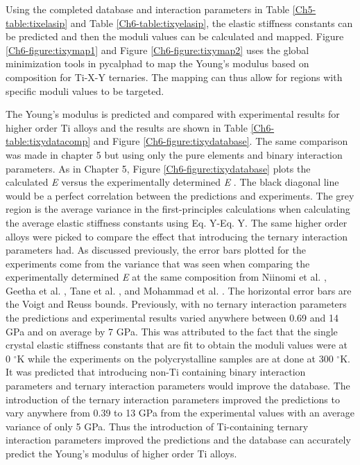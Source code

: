 Using the completed database and interaction parameters in Table \ref{Ch5-table:tixelasip} and Table \ref{Ch6-table:tixyelasip}, the elastic stiffness constants can be predicted and then the moduli values can be calculated and mapped. Figure \ref{Ch6-figure:tixymap1} and Figure \ref{Ch6-figure:tixymap2} uses the global minimization tools in pycalphad \cite{Otis2017} to map the Young's modulus based on composition for Ti-X-Y ternaries. The mapping can thus allow for regions with specific moduli values to be targeted.

The Young's modulus is predicted and compared with experimental results for higher order Ti alloys and the results are shown in Table \ref{Ch6-table:tixydatacomp} and Figure \ref{Ch6-figure:tixydatabase}. The same comparison was made in chapter 5 but using only the pure elements and binary interaction parameters. As in Chapter 5, Figure \ref{Ch6-figure:tixydatabase} plots the calculated \textit{E} versus the experimentally determined \textit{E} \cite{Mohammed2014,Geetha2009,Tane2010a}. The black diagonal line would be a perfect correlation between the predictions and experiments. The grey region is the average variance in the first-principles calculations when calculating the average elastic stiffness constants using Eq. Y-Eq. Y. The same higher order alloys were picked to compare the effect that introducing the ternary interaction parameters had. As discussed previously, the error bars plotted for the experiments come from the variance that was seen when comparing the experimentally determined \textit{E} at the same composition from Niinomi et al. \cite{Niinomi2012}, Geetha et al. \cite{Geetha2009}, Tane et al. \cite{Tane2010a}, and Mohammad et al. \cite{Mohammed2014}. The horizontal error bars are the Voigt and Reuss bounds. Previously, with no ternary interaction parameters the predictions and experimental results varied anywhere between 0.69 and 14 GPa and on average by 7 GPa. This was attributed to the fact that the single crystal elastic stiffness constants that are fit to obtain the moduli values were at 0 $^\circ$K while the experiments on the polycrystalline samples are at done at 300 $^\circ$K. It was predicted that introducing non-Ti containing binary interaction parameters and ternary interaction parameters would improve the database. The introduction of the ternary interaction parameters improved the predictions to vary anywhere from 0.39 to 13 GPa from the experimental values with an average variance of only 5 GPa. Thus the introduction of Ti-containing ternary interaction parameters improved the predictions and the database can accurately predict the Young's modulus of higher order Ti alloys.


